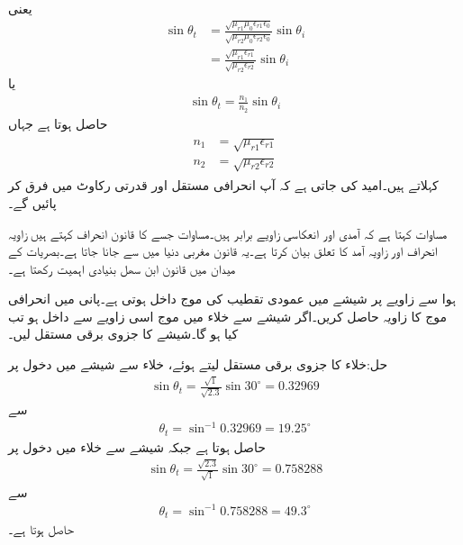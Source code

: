 یعنی
\begin{align*}
\sin \theta_t &=\frac{\sqrt{\mu_{r1} \mu_0 \epsilon_{r1} \epsilon_0}}{ \sqrt{\mu_{r2} \mu_0 \epsilon_{r2} \epsilon_0}}\sin \theta_i \\
&=\frac{\sqrt{\mu_{r1} \epsilon_{r1}}}{\sqrt{\mu_{r2} \epsilon_{r2} }}\sin \theta_i
\end{align*}
یا
\begin{align}\label{مساوات_ترچھی_سنیل_قانون}
\sin \theta_t= \frac{n_1}{n_2}\sin \theta_i
\end{align}
حاصل ہوتا ہے جہاں
\begin{gather}
\begin{aligned}
n_1&=\sqrt{\mu_{r1} \epsilon_{r1}}\\
n_2&=\sqrt{\mu_{r2} \epsilon_{r2}}
\end{aligned}
\end{gather}
 کہلاتے ہیں۔امید کی جاتی ہے کہ آپ انحرافی مستقل  اور قدرتی رکاوٹ  میں فرق کر پائیں گے۔

مساوات  کہتا ہے کہ آمدی اور انعکاسی زاویے برابر ہیں۔مساوات  جسے  کا قانون انحراف  کہتے ہیں زاویہ انحراف اور زاویہ آمد کا تعلق بیان کرتا ہے۔یہ قانون مغربی دنیا میں  سے جانا جاتا ہے۔بصریات کے میدان میں قانون ابن سھل بنیادی اہمیت رکھتا ہے۔ 

ہوا سے  زاویے پر شیشے میں عمودی تقطیب کی موج داخل ہوتی ہے۔پانی میں انحرافی موج کا زاویہ  حاصل کریں۔اگر شیشے سے خلاء میں موج اسی زاویے سے داخل ہو تب  کیا ہو گا۔شیشے کا جزوی برقی مستقل  لیں۔

حل:خلاء کا جزوی برقی مستقل  لیتے ہوئے، خلاء سے شیشے میں دخول پر
\begin{align*}
\sin \theta_t = \frac{\sqrt{1}}{\sqrt{2.3}} \sin 30^\circ= 0.32969
\end{align*}
سے
\begin{align*}
\theta_t =\sin^{-1} 0.32969=19.25^\circ
\end{align*}
حاصل ہوتا ہے جبکہ شیشے سے خلاء میں دخول پر
\begin{align*}
\sin \theta_t = \frac{\sqrt{2.3}}{\sqrt{1}} \sin 30^\circ= 0.758288
\end{align*}
سے
\begin{align*}
\theta_t =\sin^{-1} 0.758288=49.3^\circ
\end{align*}
حاصل ہوتا ہے۔

